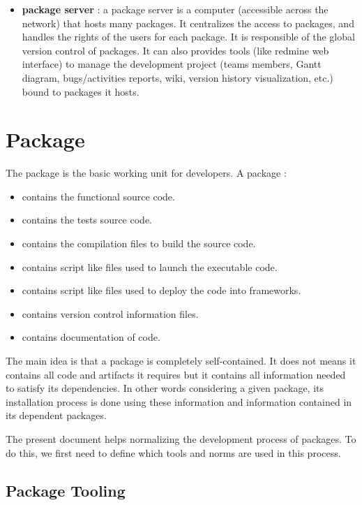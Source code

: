 \documentclass[12pt,a4paper]{article}
\begin{document}
\begin{itemize}
\item \textbf{package server} : a package server is a computer (accessible across the network) that hosts many packages. It centralizes the access to packages, and handles the rights of the users for each package. It is responsible of the global version control of packages. It can also provides tools (like redmine web interface) to manage the development project (teams members, Gantt diagram, bugs/activities reports, wiki, version history visualization, etc.) bound to packages it hosts.
\end{itemize}


\section{Package}

The package is the basic working unit for developers. A package :
\begin{itemize}
\item contains the functional source code.
\item contains the tests source code.
\item contains the compilation files to build the source code.
\item contains script like files used to launch the executable code.
\item contains script like files used to deploy the code into frameworks.
\item contains version control information files.
\item contains documentation of code.
\end{itemize}

The main idea is that a package is completely self-contained. It does not means it contains all code and artifacts it requires but it contains all information needed to satisfy its dependencies. In other words considering a given package, its installation process is done using these information and information contained in its dependent packages.

The present document helps normalizing the development process of packages. To do this, we first need to define which tools and norms are used in this process.

\subsection{Package Tooling}
\end{document}
